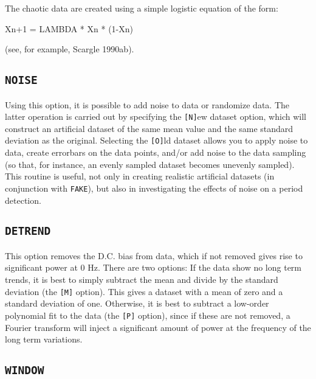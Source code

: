 \documentclass[twoside,11pt,noabs,nolof]{starlink}
\begin{document}
The chaotic data are created using a simple logistic equation of the form:

\begin{terminalv}
Xn+1 = LAMBDA * Xn * (1-Xn)
\end{terminalv}

(see, for example, Scargle 1990ab).

\subsection*{\texttt{NOISE}}

Using this option, it is possible to add noise to data or randomize data. The
latter operation is carried out by specifying the \texttt{[N]}ew dataset option,
which will construct an artificial dataset of the same mean value and the same
standard deviation as the original. Selecting the \texttt{[O]}ld dataset allows
you to apply noise to data, create errorbars on the data points, and/or add
noise to the data sampling (so that, for instance, an evenly sampled dataset
becomes unevenly sampled). This routine is useful, not only in creating
realistic artificial datasets (in conjunction with \texttt{FAKE}), but also in
investigating the effects of noise on a period detection.

\subsection*{\texttt{DETREND}}

This option removes the D.C. bias from data, which if not removed gives rise to
significant power at 0 Hz. There are two options: If the data show no long term
trends, it is best to simply subtract the mean and divide by the standard
deviation (the \texttt{[M]} option). This gives a dataset with a mean of zero and
a standard deviation of one. Otherwise, it is best to subtract a low-order
polynomial fit to the data (the \texttt{[P]} option), since if these are not
removed, a Fourier transform will inject a significant amount of power at the
frequency of the long term variations.

\subsection*{\texttt{WINDOW}}
\end{document}
